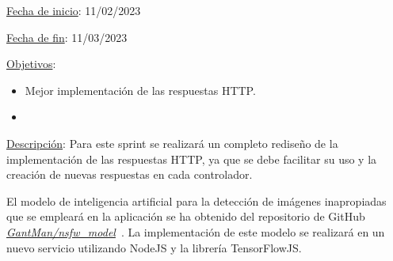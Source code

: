 
\underline{Fecha de inicio}: 11/02/2023

\underline{Fecha de fin}: 11/03/2023

\underline{Objetivos}:
\begin{itemize}
	\item Mejor implementación de las respuestas HTTP\@.
	\item {}
\end{itemize}

\underline{Descripción}:
Para este sprint se realizará un completo rediseño de la implementación de las respuestas HTTP, ya que se debe
facilitar su uso y la creación de nuevas respuestas en cada controlador.

El modelo de inteligencia artificial para la detección de imágenes inapropiadas
que se empleará en la aplicación se ha obtenido del repositorio de GitHub
\href{https://github.com/GantMan/nsfw_model}{\textit{GantMan/nsfw\_model}}~\cite{nsfw-model-repo}.
La implementación de este modelo se realizará en un nuevo servicio utilizando NodeJS y la librería TensorFlowJS\@.


